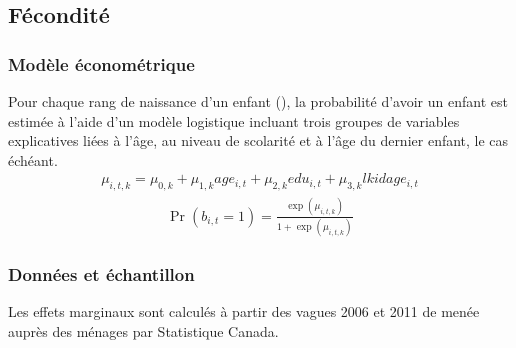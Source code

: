 \documentclass[letterpaper,10pt,french]{sphinxmanual}
\begin{document}
\subsection{Fécondité}
\label{\detokenize{methodologie:fecondite}}

\subsubsection{Modèle économétrique}
\label{\detokenize{methodologie:modele-econometrique}}
Pour chaque rang de naissance d’un enfant (), la probabilité d’avoir un enfant est estimée à l’aide d’un modèle logistique
incluant trois groupes de variables explicatives liées à l’âge, au niveau de scolarité et à l’âge du dernier enfant, le cas échéant.
\begin{equation*}
\begin{split}\mu_{i,t,k} = \mu_{0,k} + \mu_{1,k} age_{i,t} + \mu_{2,k} edu_{i,t} + \mu_{3,k} lkidage_{i,t}\end{split}
\end{equation*}\begin{equation*}
\begin{split}\Pr(b_{i,t}=1) = \frac{\exp(\mu_{i,t,k})}{1+\exp(\mu_{i,t,k})}\end{split}
\end{equation*}

\subsubsection{Données et échantillon}
\label{\detokenize{methodologie:donnees-et-echantillon}}
Les effets marginaux sont calculés à partir des vagues 2006 et 2011 de
 menée auprès des ménages
par Statistique Canada.
\end{document}
